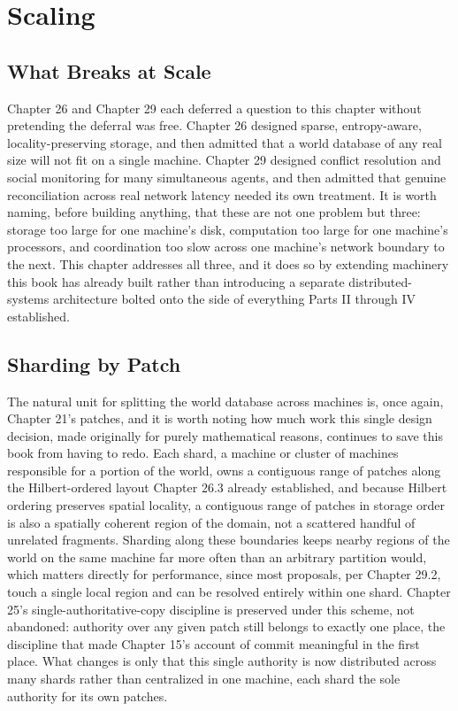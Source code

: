 \chapter{Scaling}

\section{What Breaks at Scale}

Chapter 26 and Chapter 29 each deferred a question to this chapter without pretending the deferral was free. Chapter 26 designed sparse, entropy-aware, locality-preserving storage, and then admitted that a world database of any real size will not fit on a single machine. Chapter 29 designed conflict resolution and social monitoring for many simultaneous agents, and then admitted that genuine reconciliation across real network latency needed its own treatment. It is worth naming, before building anything, that these are not one problem but three: storage too large for one machine's disk, computation too large for one machine's processors, and coordination too slow across one machine's network boundary to the next. This chapter addresses all three, and it does so by extending machinery this book has already built rather than introducing a separate distributed-systems architecture bolted onto the side of everything Parts II through IV established.

\section{Sharding by Patch}

The natural unit for splitting the world database across machines is, once again, Chapter 21's patches, and it is worth noting how much work this single design decision, made originally for purely mathematical reasons, continues to save this book from having to redo. Each shard, a machine or cluster of machines responsible for a portion of the world, owns a contiguous range of patches along the Hilbert-ordered layout Chapter 26.3 already established, and because Hilbert ordering preserves spatial locality, a contiguous range of patches in storage order is also a spatially coherent region of the domain, not a scattered handful of unrelated fragments. Sharding along these boundaries keeps nearby regions of the world on the same machine far more often than an arbitrary partition would, which matters directly for performance, since most proposals, per Chapter 29.2, touch a single local region and can be resolved entirely within one shard. Chapter 25's single-authoritative-copy discipline is preserved under this scheme, not abandoned: authority over any given patch still belongs to exactly one place, the discipline that made Chapter 15's account of commit meaningful in the first place. What changes is only that this single authority is now distributed across many shards rather than centralized in one machine, each shard the sole authority for its own patches.

